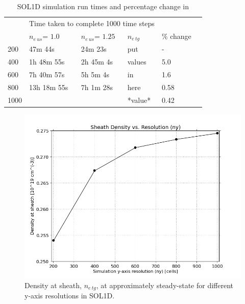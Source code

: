 \documentclass[11pt]{article}  %
\providecommand{\neus}{$n_{e~us}$} %
\providecommand{\netg}{$n_{e~tg}$} %
\begin{document}
\begin{table}[]
\caption{SOL1D simulation run times and percentage change in }
\label{tabsol1dres}
\begin{tabular}{l|l|l|l|l|l}
\multicolumn{1}{l|}{\multirow{2}{*}{}} & \multicolumn{3}{l}{Time taken to complete 1000 time steps}    \\ \cline{2-3} 
 \multicolumn{1}{l|}{Resolution}        & \multicolumn{1}{l|}{\neus = $1.0$} & \multicolumn{1}{l|}{\neus = $1.25$}  & \netg & \% change  \\ \hline
                   200                 &      47m 44s          &    24m 23s         &  put    &  -    \\
                   400                 &      1h 48m 55s       &    2h 45m 4s       &  values & 5.0   \\
                   600                 &      7h 40m 57s       &    5h 5m 4s        &  in     & 1.6   \\
                   800                 &      13h 18m 55s      &    7h 1m 28s       &  here   & 0.58  \\
                  1000                 &                   &                        & *value* & 0.42
\end{tabular}
\end{table}

\begin{figure}
\includegraphics[scale=0.48]{Figures/sol1d/RE_neres1000.png}
\centering
\caption{Density at sheath, \netg, at approximately steady-state for different y-axis resolutions in SOL1D.}\label{figRE_neres1000}
\end{figure}
\end{document}
